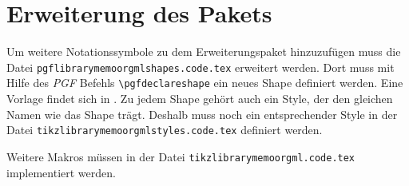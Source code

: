 \documentclass[12pt, a4paper]{article}
\begin{document}
\begin{landscape}
\begin{figure}[htbp]
\end{figure}
\end{landscape}


\section{Erweiterung des Pakets}
\label{sec:Erweiterung}
Um weitere Notationssymbole zu dem Erweiterungspaket hinzuzufügen muss die Datei \texttt{pgflibrarymemoorgmlshapes.code.tex} erweitert werden. Dort muss mit Hilfe des \textit{PGF} Befehls \lstinline|\pgfdeclareshape| ein neues Shape definiert werden. Eine Vorlage findet sich in \cite[][S. 1034]{Tantau:Tikz}. Zu jedem Shape gehört auch ein Style, der den gleichen Namen wie das Shape trägt. Deshalb muss noch ein entsprechender Style in der Datei \texttt{tikzlibrarymemoorgmlstyles.code.tex} definiert werden.\medskip

\noindent Weitere Makros müssen in der Datei \texttt{tikzlibrarymemoorgml.code.tex} implementiert werden.
\newpage


\end{document}
